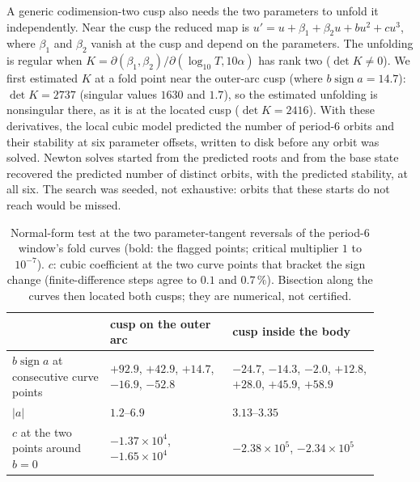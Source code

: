 \documentclass[11pt,letterpaper]{article}
\begin{document}
A generic codimension-two cusp also needs the two parameters to unfold it independently. Near the cusp the reduced
map is $u'=u+\beta_1+\beta_2u+bu^2+cu^3$, where $\beta_1$ and $\beta_2$ vanish at the cusp and depend on the
parameters. The unfolding is regular when $K=\partial(\beta_1,\beta_2)/\partial(\log_{10}T,10\alpha)$ has rank two
($\det K\neq0$). We first estimated $K$ at a fold point near the outer-arc cusp (where $b\operatorname{sign}a=14.7$):
$\det K=2737$ (singular values $1630$ and $1.7$), so the estimated unfolding is nonsingular there, as it is at the
located cusp ($\det K=2416$). With these derivatives, the local cubic model predicted the number of period-6 orbits and their
stability at six parameter offsets, written to disk before any orbit was solved. Newton solves started from the
predicted roots and from the base state recovered the predicted number of distinct orbits, with the predicted
stability, at all six. The search was seeded, not exhaustive: orbits that these starts do not reach would be missed.
\begin{table}[H]
\centering\small
\begin{tabular}{>{\raggedright\arraybackslash}p{0.24\linewidth}>{\raggedright\arraybackslash}p{0.3\linewidth}>{\raggedright\arraybackslash}p{0.36\linewidth}}
\toprule
 & cusp on the outer arc & cusp inside the body \\
\midrule
$b\operatorname{sign}a$ at consecutive curve points & $+92.9$, $+42.9$, $+14.7$, $\mathbf{-16.9}$, $-52.8$ &
  $-24.7$, $-14.3$, $-2.0$, $\mathbf{+12.8}$, $+28.0$, $+45.9$, $+58.9$ \\
$|a|$ & $1.2$--$6.9$ & $3.13$--$3.35$ \\
$c$ at the two points around $b=0$ & $-1.37\times10^{4}$, $-1.65\times10^{4}$ & $-2.38\times10^{5}$, $-2.34\times10^{5}$ \\
\bottomrule
\end{tabular}
\caption{Normal-form test at the two parameter-tangent reversals of the period-6 window's fold curves (bold: the
flagged points; critical multiplier $1$ to $10^{-7}$). $c$: cubic coefficient at the two curve points that bracket
the sign change (finite-difference steps agree to $0.1$ and $0.7\,\%$). Bisection along the curves then located both cusps; they are numerical, not certified.}
\label{tab:z3cusps}
\end{table}
\end{document}

